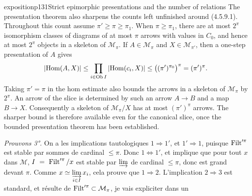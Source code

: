 \begin{dcomment}{exposition}{p131}{Strict epimorphic presentations and the number of relations}
The presentation theorem also sharpens the counts left unfinished around (4.5.9.1). Throughout this count assume $\pi'\geq\pi\geq\pi_1$. When $\pi\geq\pi_1$, there are at most $2^\pi$ isomorphism classes of diagrams of at most $\pi$ arrows with values in $C_0$, and hence at most $2^\pi$ objects in a skeleton of $\mathcal M_\pi$. If $A\in\mathcal M_\pi$ and $X\in\mathcal M_{\pi'}$, then a one-step presentation of $A$ gives
\[
 |\mathrm{Hom}(A,X)|\leq
 \prod_{i\in\mathrm{Ob}\, I}|\mathrm{Hom}(c_i,X)|
 \leq\bigl((\pi')^{\pi_0}\bigr)^\pi
 =(\pi')^\pi.
\]
Taking $\pi'=\pi$ in the hom estimate also bounds the arrows in a skeleton of $\mathcal M_\pi$ by $2^\pi$. An arrow of the slice is determined by such an arrow $A\to B$ and a map $B\to X$. Consequently a skeleton of $\mathcal M_\pi/X$ has at most $(\pi')^\pi$ arrows. The sharper bound is therefore available even for the canonical slice, once the bounded presentation theorem has been established.
\end{dcomment}


\textit{Prouvons 3°.} On a les implications tautologiques $1 \Longrightarrow 1'$, et $1' \Longrightarrow 1$, puisque $\operatorname{Filt}'^{\pi}$ est stable par sommes de cardinal $\leqslant \pi$. Donc $1 \Longleftrightarrow 1'$, et implique que pour tout $x$ dans $\mathcal{M}$,
$I \ = \ \operatorname{Filt}'^{\pi}/x$ est stable par $\varinjlim$ de cardinal $\leqslant \pi$, donc est grand devant $\pi$. Comme $x \simeq \varinjlim\limits_{i\in I} x_i$, cela prouve que $1 \Longrightarrow 2$. L'implication $2 \Longrightarrow 3$ est standard, et résulte de $\operatorname{Filt}'^{\pi} \subset \mathcal{M}_{\pi}$, je vais expliciter dans un

